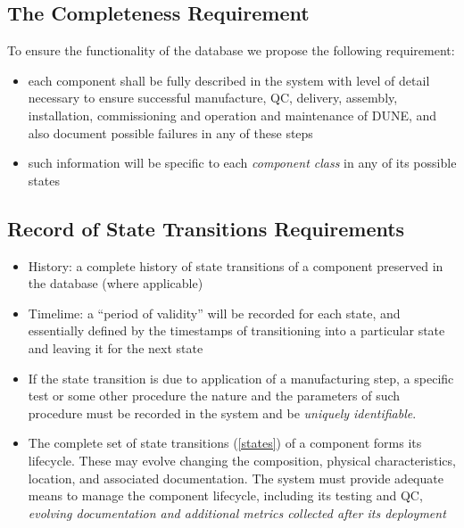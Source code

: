 \documentclass[pdftex,12pt,letter]{article}
\begin{document}
\subsection{The Completeness Requirement}

To ensure the functionality of the database we propose the following requirement:
\begin{itemize}
\item each component shall be fully described in the system with level of detail necessary to
ensure successful manufacture, QC, delivery, assembly, installation, commissioning
and operation and maintenance of DUNE, and also document possible failures in any of these steps

\item such information will be specific to each \textit{component class} in any of its possible states %

\end{itemize}


\subsection{Record of State Transitions Requirements}
\label{history}
\begin{itemize}

\item History: a complete history of state transitions of a component  preserved in the database (where applicable)

\item Timelime: a ``period of validity'' will be recorded for each state, and essentially defined by the timestamps
of transitioning into a particular state and leaving it for the next state

\item If the state transition is due to application of a manufacturing step, a specific test or some other procedure
the nature and the parameters of such procedure must be recorded in the system and be \textit{uniquely identifiable}.

\item The complete set of state transitions (\ref{states}) of a component forms its lifecycle. These may
evolve changing the composition, physical characteristics, location, and associated documentation.
The system must provide adequate means to manage the component lifecycle, including its
testing and QC, \textit{evolving documentation and additional metrics collected after its deployment}

\end{itemize}
\end{document}
